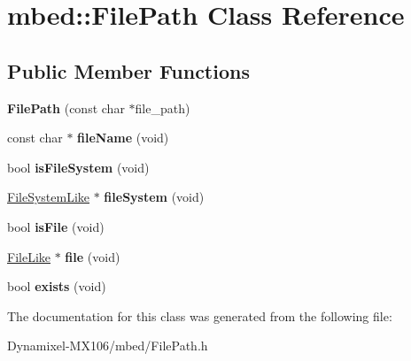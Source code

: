 \hypertarget{classmbed_1_1_file_path}{}\section{mbed\+:\+:File\+Path Class Reference}
\label{classmbed_1_1_file_path}
\subsection*{Public Member Functions}
\begin{DoxyCompactItemize}
\item 
{\bfseries File\+Path} (const char $\ast$file\+\_\+path)\hypertarget{classmbed_1_1_file_path_a8ab3386715d0bba08598ff7d6d808b2f}{}\label{classmbed_1_1_file_path_a8ab3386715d0bba08598ff7d6d808b2f}

\item 
const char $\ast$ {\bfseries file\+Name} (void)\hypertarget{classmbed_1_1_file_path_a7c6024cd8c7b93ce267b3bfa20165a47}{}\label{classmbed_1_1_file_path_a7c6024cd8c7b93ce267b3bfa20165a47}

\item 
bool {\bfseries is\+File\+System} (void)\hypertarget{classmbed_1_1_file_path_af5b6f97de6af234024168f33e6f9b37a}{}\label{classmbed_1_1_file_path_af5b6f97de6af234024168f33e6f9b37a}

\item 
\hyperlink{classmbed_1_1_file_system_like}{File\+System\+Like} $\ast$ {\bfseries file\+System} (void)\hypertarget{classmbed_1_1_file_path_ab905306788354319208e23cbda225ed0}{}\label{classmbed_1_1_file_path_ab905306788354319208e23cbda225ed0}

\item 
bool {\bfseries is\+File} (void)\hypertarget{classmbed_1_1_file_path_ac6a8b31743394dfc69b17797cbf8d5cf}{}\label{classmbed_1_1_file_path_ac6a8b31743394dfc69b17797cbf8d5cf}

\item 
\hyperlink{classmbed_1_1_file_like}{File\+Like} $\ast$ {\bfseries file} (void)\hypertarget{classmbed_1_1_file_path_a978e3d43e0432cdaf7326b4c078203b0}{}\label{classmbed_1_1_file_path_a978e3d43e0432cdaf7326b4c078203b0}

\item 
bool {\bfseries exists} (void)\hypertarget{classmbed_1_1_file_path_a639f23eef059adca9af13ce3ba180e60}{}\label{classmbed_1_1_file_path_a639f23eef059adca9af13ce3ba180e60}

\end{DoxyCompactItemize}


The documentation for this class was generated from the following file\+:\begin{DoxyCompactItemize}
\item 
Dynamixel-\/\+M\+X106/mbed/File\+Path.\+h\end{DoxyCompactItemize}
